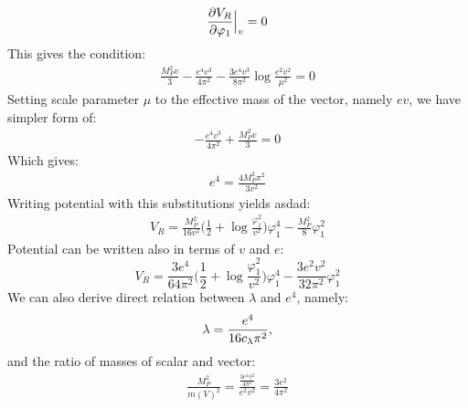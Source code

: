 \begin{align}
\frac{\partial V_R}{\partial \varphi_1} \Big|_v= 0
\end{align}
This gives the condition:
\begin{align}
\frac{M_P^2v}{3}-\frac{e^4v^3}{4\pi^2}-\frac{3e^4v^3}{8\pi^2}\log\frac{e^2v^2}{\mu^2}=0
\end{align}
Setting scale parameter $\mu$ to the effective mass of the vector, namely $ev$, we have 
simpler form of:
\begin{align}
-\frac{e^4v^3}{4\pi^2}+\frac{M_P^2v}{3}=0
\end{align}
Which gives:
\begin{align}
e^4 = \frac{4M_P^2\pi^2}{3v^2}
\end{align}
Writing potential with this substitutions yields asdad:
\begin{align}
V_R = \frac{M_P^2}{16v^2}\Big(\frac{1}{2}+\log\frac{\varphi_1^2}{v^2}\Big)\varphi_1^4- 
\frac{M_P^2}{8}\varphi_1^2
\end{align}
Potential can be written also in terms of $v$ and $e$:
\begin{equation}
V_R=\frac{3e^4}{64\pi^2}\Big(\frac{1}{2}+\log\frac{\varphi_1^2}{v^2}\Big)\varphi_1^4- 
\frac{3e^2v^2}{32\pi^2}\varphi_1^2
\end{equation}
We can also derive direct relation between $\lambda$ and $e^4$, namely:
\begin{align}
\lambda = \frac{e^4}{16c_\lambda\pi^2},
\end{align}
and the ratio of masses of scalar and vector:
\begin{align}
\frac{M_P^2}{m(V)^2} = \frac{\frac{3e^4v^2}{4\pi^2}}{e^2v^2} = \frac{3e^2}{4\pi^2}
\end{align}
